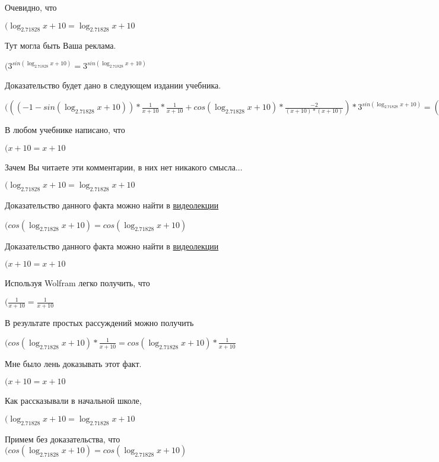 \documentclass[12pt,a4paper,fleqn]{article}
\theoremstyle{definition}
\begin{document}
Очевидно, что

$(\log_{ 2.71828 }{ x  +  10 } = \log_{ 2.71828 }{ x  +  10 }$

Тут могла быть Ваша реклама.

$({ 3 }^{sin(\log_{ 2.71828 }{ x  +  10 })} = { 3 }^{sin(\log_{ 2.71828 }{ x  +  10 })}$

Доказательство будет дано в следующем издании учебника.

$((( -1  - sin(\log_{ 2.71828 }{ x  +  10 })) * \frac{ 1 }{ x  +  10 }
 * \frac{ 1 }{ x  +  10 }
 + cos(\log_{ 2.71828 }{ x  +  10 }) * \frac{ -2 }{( x  +  10 ) * ( x  +  10 )}
) * { 3 }^{sin(\log_{ 2.71828 }{ x  +  10 })} = (( -1  - sin(\log_{ 2.71828 }{ x  +  10 })) * \frac{ 1 }{ x  +  10 }
 * \frac{ 1 }{ x  +  10 }
 + cos(\log_{ 2.71828 }{ x  +  10 }) * \frac{ -2 }{( x  +  10 ) * ( x  +  10 )}
) * { 3 }^{sin(\log_{ 2.71828 }{ x  +  10 })}$

В любом учебнике написано, что

$( x  +  10  =  x  +  10 $

Зачем Вы читаете эти комментарии, в них нет никакого смысла...

$(\log_{ 2.71828 }{ x  +  10 } = \log_{ 2.71828 }{ x  +  10 }$

Доказательство данного факта можно найти в \href{https://www.youtube.com/watch?v=dQw4w9WgXcQ}{видеолекции}

$(cos(\log_{ 2.71828 }{ x  +  10 }) = cos(\log_{ 2.71828 }{ x  +  10 })$

Доказательство данного факта можно найти в \href{https://www.youtube.com/watch?v=dQw4w9WgXcQ}{видеолекции}

$( x  +  10  =  x  +  10 $

Используя Wolfram легко получить, что

$(\frac{ 1 }{ x  +  10 }
 = \frac{ 1 }{ x  +  10 }
$

В результате простых рассуждений можно получить

$(cos(\log_{ 2.71828 }{ x  +  10 }) * \frac{ 1 }{ x  +  10 }
 = cos(\log_{ 2.71828 }{ x  +  10 }) * \frac{ 1 }{ x  +  10 }
$

Мне было лень доказывать этот факт.

$( x  +  10  =  x  +  10 $

Как рассказывали в начальной школе,

$(\log_{ 2.71828 }{ x  +  10 } = \log_{ 2.71828 }{ x  +  10 }$

Примем без доказательства, что
$(cos(\log_{ 2.71828 }{ x  +  10 }) = cos(\log_{ 2.71828 }{ x  +  10 })$
\end{document}

